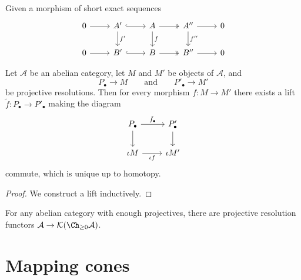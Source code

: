 \documentclass[main.tex]{subfiles}
\begin{document}
\begin{theorem}
  \label{thm:horseshoe_lemma_for_morphisms}
  Given a morphism of short exact sequences
  \begin{equation*}
    \begin{tikzcd}
      0
      \arrow[r]
      & A'
      \arrow[r, hook]
      \arrow[d, "f'"]
      & A
      \arrow[r, two heads]
      \arrow[d, "f"]
      & A''
      \arrow[r]
      \arrow[d, "f''"]
      & 0
      \\
      0
      \arrow[r]
      & B'
      \arrow[r, hook]
      & B
      \arrow[r, two heads]
      & B''
      \arrow[r]
      & 0
    \end{tikzcd}
  \end{equation*}
\end{theorem}

\begin{proposition}
  \label{prop:can_lift_morphisms_to_projective_resolutions}
  Let $\mathcal{A}$ be an abelian category, let $M$ and $M'$ be objects of $\mathcal{A}$, and
  \begin{equation*}
    P_{\bullet} \to M \qquad\text{and}\qquad P'_{\bullet} \to M'
  \end{equation*}
  be projective resolutions. Then for every morphism $f\colon M \to M'$ there exists a lift $\tilde{f}\colon P_{\bullet} \to P'_{\bullet}$ making the diagram
  \begin{equation*}
    \begin{tikzcd}
      P_{\bullet}
      \arrow[r, "\tilde{f}_{\bullet}"]
      \arrow[d]
      & P'_{\bullet}
      \arrow[d]
      \\
      \iota M
      \arrow[r, swap, "\iota f"]
      & \iota M'
    \end{tikzcd}
  \end{equation*}
  commute, which is unique up to homotopy.
\end{proposition}
\begin{proof}
  We construct a lift inductively.
\end{proof}

\begin{corollary}
  \label{cor:projective_resolution_functor}
  For any abelian category with enough projectives, there are projective resolution functors $\mathcal{A} \to \mathcal{K}(\Ch_{\geq 0}\mathcal{A})$.
\end{corollary}

\section{Mapping cones}
\label{sec:mapping_cones}
\end{document}
